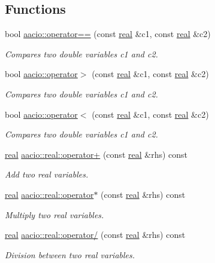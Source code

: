 \subsection*{Functions}
\begin{DoxyCompactItemize}
\item 
bool \mbox{\hyperlink{group__real_ga37515f3f3a7c985eeb90435974576fbf}{aacio\+::operator==}} (const \mbox{\hyperlink{classaacio_1_1real}{real}} \&c1, const \mbox{\hyperlink{classaacio_1_1real}{real}} \&c2)
\begin{DoxyCompactList}\small\item\em Compares two double variables c1 and c2. \end{DoxyCompactList}\item 
bool \mbox{\hyperlink{group__real_gaead95e1ee7599f6710bf89c6490ab1a5}{aacio\+::operator$>$}} (const \mbox{\hyperlink{classaacio_1_1real}{real}} \&c1, const \mbox{\hyperlink{classaacio_1_1real}{real}} \&c2)
\begin{DoxyCompactList}\small\item\em Compares two double variables c1 and c2. \end{DoxyCompactList}\item 
bool \mbox{\hyperlink{group__real_gaef11411f358f9f1a3b8c8e52fdf3c5f3}{aacio\+::operator$<$}} (const \mbox{\hyperlink{classaacio_1_1real}{real}} \&c1, const \mbox{\hyperlink{classaacio_1_1real}{real}} \&c2)
\begin{DoxyCompactList}\small\item\em Compares two double variables c1 and c2. \end{DoxyCompactList}\item 
\mbox{\hyperlink{classaacio_1_1real}{real}} \mbox{\hyperlink{group__real_gad6bd588e0aa69227458b61d2ca48bacc}{aacio\+::real\+::operator+}} (const \mbox{\hyperlink{classaacio_1_1real}{real}} \&rhs) const
\begin{DoxyCompactList}\small\item\em Add two real variables. \end{DoxyCompactList}\item 
\mbox{\hyperlink{classaacio_1_1real}{real}} \mbox{\hyperlink{group__real_gaf2078aa77b91b501d0f4c068c0a9c8fe}{aacio\+::real\+::operator$\ast$}} (const \mbox{\hyperlink{classaacio_1_1real}{real}} \&rhs) const
\begin{DoxyCompactList}\small\item\em Multiply two real variables. \end{DoxyCompactList}\item 
\mbox{\hyperlink{classaacio_1_1real}{real}} \mbox{\hyperlink{group__real_gaaedf18a9e2e314ff892f7f942b09cbcf}{aacio\+::real\+::operator/}} (const \mbox{\hyperlink{classaacio_1_1real}{real}} \&rhs) const
\begin{DoxyCompactList}\small\item\em Division between two real variables. \end{DoxyCompactList}\end{DoxyCompactItemize}


